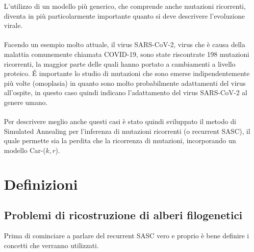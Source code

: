 \documentclass[12pt]{report}
\begin{document}
  L'utilizzo di un modello più generico, che comprende anche mutazioni ricorrenti, diventa in più particolarmente importante quanto si deve descrivere l'evoluzione virale.\\\\
  Facendo un esempio molto attuale, il virus SARS-CoV-2, virus che è causa della malattia comunemente chiamata COVID-19, sono state riscontrate 198 mutazioni ricorrenti, la maggior parte delle quali hanno portato a cambiamenti a livello proteico\cite{VANDORP2020104351}.
  \'E importante lo studio di mutazioni che sono emerse indipendentemente più volte (omoplasia) in quanto sono molto probabilmente adattamenti del virus all'ospite, in questo caso quindi indicano l'adattamento del virus SARS-CoV-2 al genere umano\cite{VANDORP2020104351}.\\\\
  Per descrivere meglio anche questi casi è stato quindi sviluppato il metodo di Simulated Annealing per l'inferenza di mutazioni ricorrenti (o recurrent SASC), il quale permette sia la perdita che la ricorrenza di mutazioni, incorporando un modello Car-($k, r$).

\chapter{Definizioni}

\section{Problemi di ricostruzione di alberi filogenetici}
  Prima di cominciare a parlare del recurrent SASC vero e proprio è bene definire i concetti che verranno utilizzati.\\
\end{document}

